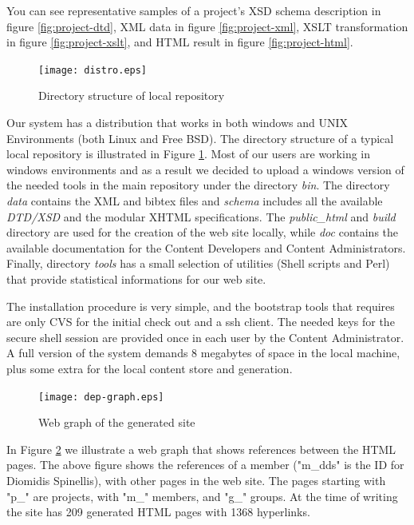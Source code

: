 \documentclass[10pt]{article}
\begin{document}
You can see representative samples of a project's
{\sc XSD} schema description in figure \ref{fig:project-dtd},
{\sc XML} data in figure \ref{fig:project-xml},
XSLT transformation in figure \ref{fig:project-xslt},
and {\sc HTML} result in figure \ref{fig:project-html}.

\begin{figure}
\texttt{[image: distro.eps]}
\caption{Directory structure of local repository}
\label{fig:eltrun-web-distro}
\end{figure}

Our system has a distribution that works in both {\sc windows} and 
{\sc UNIX} Environments (both Linux and Free BSD). The directory structure of a typical 
local repository is illustrated in Figure \ref{fig:eltrun-web-distro}.
Most of our users are working in {\sc windows} environments and as 
a result we decided to upload a {\sc windows} version of the needed tools 
in the main repository under the directory \textit{bin}.
The directory \textit{data} contains the {\sc XML} and {\sc bibtex} files and \textit{schema}
includes all the available \textit{DTD/XSD} and the modular {\sc XHTML} specifications.
The \textit{public\_html} and \textit{build} directory are used for the creation of the 
web site locally, while \textit{doc} contains the available documentation for the Content Developers
and Content Administrators. Finally, directory \textit{tools} has a small selection 
of utilities (Shell scripts and {\sc Perl}) that provide statistical informations
for our web site.

The installation procedure is very simple,
and the bootstrap tools that requires are only {\sc CVS} for 
the initial check out and a ssh client. The needed keys 
for the secure shell session are provided once in each user by the Content Administrator. 
A full version of the system demands 8 megabytes of space 
in the local machine, plus some extra for the local content store and generation.

\begin{figure}
\texttt{[image: dep-graph.eps]}
\caption{Web graph of the generated site}
\label{fig:eltrun-web-m-dds-snapshot}
\end{figure}

In Figure \ref{fig:eltrun-web-m-dds-snapshot} we illustrate a web graph \cite{KRRSTU00} 
that shows references between the {\sc HTML} pages.
The above figure shows the references  of a member ("m\_dds" is the ID for 
Diomidis Spinellis), with other pages in the web site.
The pages starting with "p\_" are projects, with "m\_" members, and "g\_" groups.
At the time of writing the site has 209 generated {\sc HTML} pages with 1368 hyperlinks. 
\end{document}
